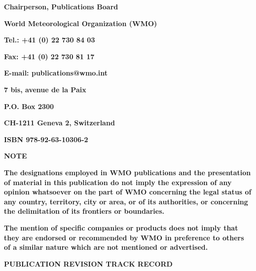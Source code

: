 \textbf{Chairperson, Publications Board}

\textbf{World Meteorological Organization (WMO)}

\textbf{Tel.: +41 (0) 22 730 84 03}

\textbf{Fax: +41 (0) 22 730 81 17}

\textbf{E-mail: publications@wmo.int}

\textbf{7 bis, avenue de la Paix}

\textbf{P.O. Box 2300}

\textbf{CH-1211 Geneva 2, Switzerland}

\textbf{ISBN 978-92-63-10306-2}

\textbf{NOTE}

\textbf{The designations employed in WMO publications and the presentation of material in this publication do not imply the expression of any opinion whatsoever on the part of WMO concerning the legal status of any country, territory, city or area, or of its authorities, or concerning the delimitation of its frontiers or boundaries.}

\textbf{The mention of specific companies or products does not imply that they are endorsed or recommended by WMO in preference to others of a similar nature which are not mentioned or advertised.}

\textbf{PUBLICATION REVISION TRACK RECORD}

